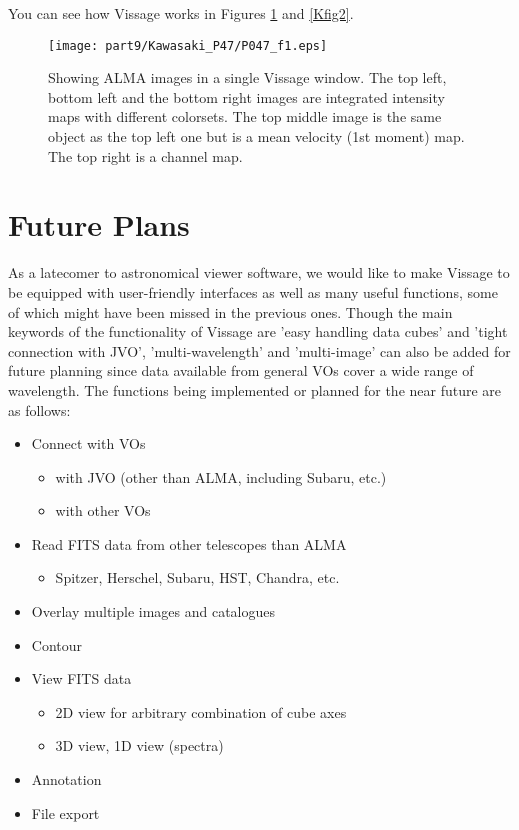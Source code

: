 You can see how Vissage works in Figures \ref{Kfig1} and \ref{Kfig2}. 

\begin{figure}[tb]
  \centering
  \texttt{[image: part9/Kawasaki\_P47/P047\_f1.eps]}
  \caption{Showing ALMA images in a single Vissage window. The top left, bottom left and the bottom right images are integrated intensity maps with different colorsets. The top middle image is the same object as the top left one but is a mean velocity (1st moment) map. The top right is a channel map.}
  \label{Kfig1}
\end{figure}

\section{Future Plans}
As a latecomer to astronomical viewer software, we would like to make Vissage to be equipped with user-friendly interfaces as well as many useful functions, some of which might have been missed in the previous ones. Though the main keywords of the functionality of Vissage are 'easy handling data cubes' and 'tight connection with JVO', 'multi-wavelength' and 'multi-image' can also be added for future planning since data available from general VOs cover a wide range of wavelength. The functions being implemented or planned for the near future are as follows: 

\begin{itemize}
  \item Connect with VOs
    \begin{itemize}
      \item with JVO (other than ALMA, including Subaru, etc.)
      \item with other VOs
    \end{itemize}
  \item Read FITS data from other telescopes than ALMA
    \begin{itemize}
      \item Spitzer, Herschel, Subaru, HST, Chandra, etc.
    \end{itemize}
  \item Overlay multiple images and catalogues
  \item Contour
  \item View FITS data
    \begin{itemize}
      \item 2D view for arbitrary combination of cube axes
      \item 3D view, 1D view (spectra)
    \end{itemize}
  \item Annotation
  \item File export
\end{itemize}

